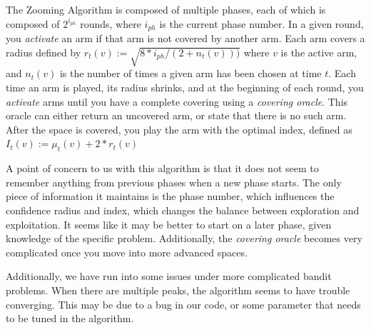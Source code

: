 \documentclass{article}
\begin{document}
The Zooming Algorithm is composed of multiple phases, each of which is
composed of $2^{i_{ph}}$ rounds, where $i_{ph}$ is the current phase
number. In a given round, you \emph{activate} an arm if that arm is
not covered by another arm. Each arm covers a radius defined by
$r_t(v):=\sqrt{8*i_{ph}/(2+n_t(v)))}$ where $v$ is the active arm, and
$n_t(v)$ is the number of times a given arm has been chosen at time
$t$. Each time an arm is played, its radius shrinks, and at the
beginning of each round, you \emph{activate} arms until you have a
complete covering using a \emph{covering oracle}. This oracle can
either return an uncovered arm, or state that there is no such
arm. After the space is covered, you play the arm with the optimal
index, defined as $I_t(v):=\mu_t(v)+2*r_t(v)$

A point of concern to us with this algorithm is that it does not seem
to remember anything from previous phases when a new phase starts. The
only piece of information it maintains is the phase number, which
influences the confidence radius and index, which changes the balance
between exploration and exploitation. It seems like it may be better
to start on a later phase, given knowledge of the specific
problem. Additionally, the \emph{covering oracle} becomes very
complicated once you move into more advanced spaces.

Additionally, we have run into some issues under more complicated
bandit problems. When there are multiple peaks, the algorithm seems to
have trouble converging. This may be due to a bug in our code, or some
parameter that needs to be tuned in the algorithm.
\end{document}
